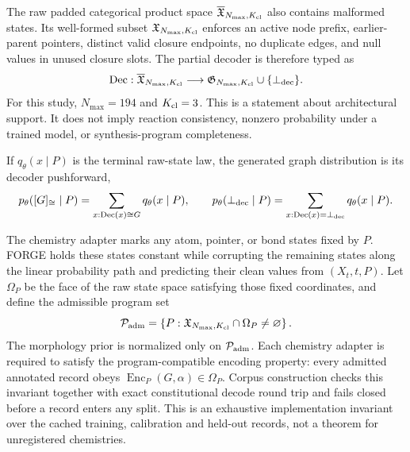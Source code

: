 \documentclass{article}
\begin{document}
The raw padded categorical product space $\overline{\mathfrak X}_{N_{\max},K_{\rm cl}}$ also
contains malformed states. Its well-formed subset $\mathfrak X_{N_{\max},K_{\rm cl}}$ enforces an
active node prefix, earlier-parent pointers, distinct valid closure endpoints, no duplicate edges,
and null values in unused closure slots. The partial decoder is therefore typed as
\begin{equation}
    \operatorname{Dec}:\overline{\mathfrak X}_{N_{\max},K_{\rm cl}}
    \longrightarrow
    \mathfrak G_{N_{\max},K_{\rm cl}}\cup\{\bot_{\rm dec}\}.
\end{equation}
For this study, $N_{\max}=194$ and $K_{\rm cl}=3$.
This is a statement about architectural support.
It does not imply reaction consistency, nonzero probability under a trained model, or
synthesis-program completeness.

If $q_\theta(x\mid P)$ is the terminal raw-state law, the generated graph distribution is its
decoder pushforward,
\begin{equation}
    p_\theta([G]_{\cong}\mid P)
    =\sum_{x:\operatorname{Dec}(x)\cong G}q_\theta(x\mid P),
    \qquad
    p_\theta(\bot_{\rm dec}\mid P)
    =\sum_{x:\operatorname{Dec}(x)=\bot_{\rm dec}}q_\theta(x\mid P).
\end{equation}

The chemistry adapter marks any atom, pointer, or bond states fixed by $P$.
FORGE holds these states constant while corrupting the remaining states along the linear probability
path and predicting their clean values from $(X_t,t,P)$. Let $\Omega_P$ be the face of the raw state
space satisfying those fixed coordinates, and define the admissible program set
\begin{equation}
    \mathcal P_{\rm adm}
    =\left\{P:\mathfrak X_{N_{\max},K_{\rm cl}}\cap\Omega_P\neq\varnothing\right\}.
\end{equation}
The morphology prior is normalized only on $\mathcal P_{\rm adm}$. Each chemistry adapter is required
to satisfy the program-compatible encoding property: every admitted annotated record obeys
$\operatorname{Enc}_P(G,\alpha)\in\Omega_P$. Corpus construction checks this invariant together
with exact constitutional decode round trip and fails closed before a record enters any split. This
is an exhaustive implementation invariant over the cached training, calibration and held-out
records, not a theorem for unregistered chemistries.
\end{document}
